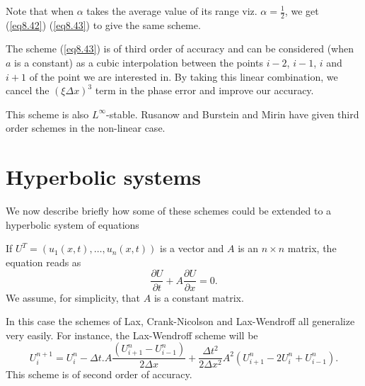 Note that when $\alpha$ takes the average value of its range viz. $\alpha = \frac{1}{2}$, we get (\ref{eq8.42}) (\ref{eq8.43}) to give the same scheme. 

The scheme (\ref{eq8.43}) is of third order of accuracy and can be
considered (when $a$ is a constant) as a cubic interpolation between the
points $i-2$, $i-1$, $i$ and $i+1$ of the point we are interested
in. By taking this linear combination, we cancel the $(\xi \Delta
x)^3$ term in the phase error and improve our accuracy. 

This scheme is also $L^\infty$-stable. Rusanow \cite{key35} and Burstein and Mirin \cite{key5} have given third order schemes in the non-linear case.

\section{Hyperbolic systems}\label{chap8:sec8.9}
We now describe briefly how some of these schemes could be extended to a hyperbolic system of equations

If $U^T = (u_1 (x,t), \ldots, u_n (x,t))$ is a vector and $A$ is an $n \times n$ matrix, the equation reads as
\begin{equation*}
\frac{\partial U}{\partial t} + A \frac{\partial U}{\partial x} =0.
\tag{8.44}\label{eq8.44}
\end{equation*}
We assume, for simplicity, that $A$ is a constant matrix.

In this case the schemes of Lax, Crank-Nicolson and Lax-Wendroff all generalize very easily. For instance, the Lax-Wendroff scheme will be 
\begin{equation*}
U^{n+1}_i = U^n_i - \Delta t. A \frac{(U^n_{i+1} - U^n_{i-1})}{2\Delta x} + \frac{\Delta t^2}{2\Delta x^2} A^2 (U^n_{i+1} - 2U^n_i+ U^n_{i-1}) . \tag{8.45}\label{eq8.45}
\end{equation*}
This scheme is of second order of accuracy.

